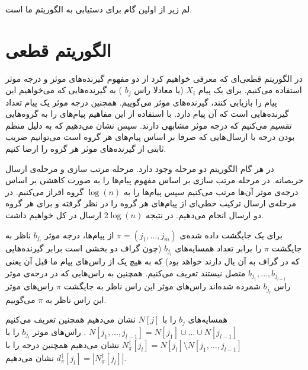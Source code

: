 \subsubsection{}
لم زیر از
\cite{7176784}
اولین گام برای دستیابی به الگوریتم ما است.
\section{
	الگوریتم قطعی
	}

در الگوریتم قطعی‌ای که معرفی خواهیم کرد از دو مفهوم گیرنده‌های موثر و درجه موثر استفاده می‌کنیم. برای یک پیام
$X_i$
(یا معادلا راس
$b_j$
)
به گیرنده‌هایی که می‌خواهیم این پیام را بازیابی کنند، گیرنده‌های موثر می‌گوییم. همچنین درجه موثر یک پیام تعداد گیرنده‌هایی است که آن پیام دارد. با استفاده از این مفاهیم پیام‌های را به گروه‌هایی تقسیم می‌کنیم که درجه موثر مشابهی دارند. سپس نشان می‌دهیم که به دلیل منظم بودن درجه با ارسال‌هایی که صرفا بر اساس پیام‌های هر گروه است می‌توانیم ضریب ثابتی از گیرنده‌های موثر هر گروه را ارضا کنیم.

در هر گام الگوریتم
دو مرحله وجود دارد. مرحله مرتب سازی و مرحله‌ی ارسال حریصانه. در مرحله مرتب سازی بر اساس مفهوم پیام‌ها را به صورت کاهشی بر اساس درجه‌ی موثر آن‌ها مرتب می‌کنیم سپس پیام‌ها را به 
$\log(n)$
گروه افراز می‌کنیم. در مرحله‌ی ارسال ترکیب خطی‌ای از پیام‌های هر گروه را در نظر گرفته و برای هر گروه دو ارسال انجام می‌دهیم. در نتیجه
$2 \log(n)$
ارسال در کل خواهیم داشت.

\begin{definition}
	برای یک جایگشت داده شده‌ی 
	$\pi = (j_1, \ldots, j_m)$
	از پیام‌ها، درجه موثر
	$b_{j_l}$
	ناظر به جایگشت 
	$\pi$
	را برابر تعداد همسایه‌های 
	$b_{j_l}$
	(چون گراف دو بخشی است برابر گیرنده‌هایی که در گراف به آن یال دارند خواهد بود)	که به هیچ یک از راس‌‌های پیام ما قبل آن یعنی
	$b_{j_1}, \ldots, b_{j_{l - 1}}$
	متصل نیستند تعریف می‌کنیم. همچنین به راس‌هایی که در درجه‌ی موثر راس
		$b_{j_l}$
		شمرده شده‌اند راس‌های موثر این راس ناظر به جایگشت
		$\pi$
		راس‌های موثر این راس ناظر به
		$\pi$
		 می‌گوییم.
		 
		 همسایه‌های
		 $b_j$
		 را با
		 $N[j]$
		 نشان می‌دهیم همچنین تعریف می‌کنیم
		 $N[j_1, \ldots, j_{l - 1}] = N[j_1] \cup \ldots \cup N[j_{l - 1}]$
		 . راس‌های موثر
 		$b_{j_l}$
 		را با
 		$N^\dagger_\pi [j_l] = N[j_l] \setminus N[j_1, \ldots, j_{l - 1}]$
 		نشان می‌دهیم همچنین درجه را با
 		$d^\dagger_\pi[j_l] = |N^\dagger_\pi [j_l] |$
 		نشان می‌دهیم.
\end{definition}

